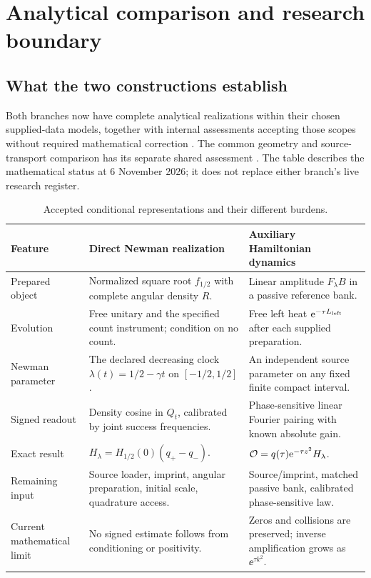 \section{Analytical comparison and research boundary}\label{sec:scope}

\subsection{What the two constructions establish}
Both branches now have complete analytical realizations within their
chosen supplied-data models, together with internal assessments accepting
those scopes without required mathematical correction
\cite{TNDDirectReview,TNDAuxReview}. The common geometry and
source-transport comparison has its separate shared assessment
\cite{TNDSharedReview}. The table describes the mathematical status at
6 November 2026; it does not replace either branch's live research register.

\begin{table}[ht]
\small\centering
\begin{tabularx}{\textwidth}{@{}>{\raggedright\arraybackslash}p{}YY@{}}\toprule
Feature & Direct Newman realization & Auxiliary Hamiltonian dynamics \\\midrule
Prepared object & Normalized square root $f_{1/2}$ with complete angular density $R$. & Linear amplitude $F_\lambda B$ in a passive reference bank. \\
Evolution & Free unitary and the specified count instrument; condition on no count. & Free left heat $\mathrm e^{-\tau L_{\rm left}}$ after each supplied preparation. \\
Newman parameter & The declared decreasing clock $\lambda(t)=1/2-\gamma t$ on $[-1/2,1/2]$. & An independent source parameter on any fixed finite compact interval. \\
Signed readout & Density cosine in $Q_t$, calibrated by joint success frequencies. & Phase-sensitive linear Fourier pairing with known absolute gain. \\
Exact result & $H_\lambda=H_{1/2}(0)(q_+-q_-)$. & $\mathcal O=q(\tau)\mathrm e^{-\tau z^2}H_\lambda$. \\
Remaining input & Source loader, imprint, angular preparation, initial scale, quadrature access. & Source/imprint, matched passive bank, calibrated phase-sensitive law. \\
Current mathematical limit & No signed estimate follows from conditioning or positivity. & Zeros and collisions are preserved; inverse amplification grows as $\ee^{\tau k^2}$. \\
\bottomrule\end{tabularx}
\caption{Accepted conditional representations and their different burdens.}
\end{table}

